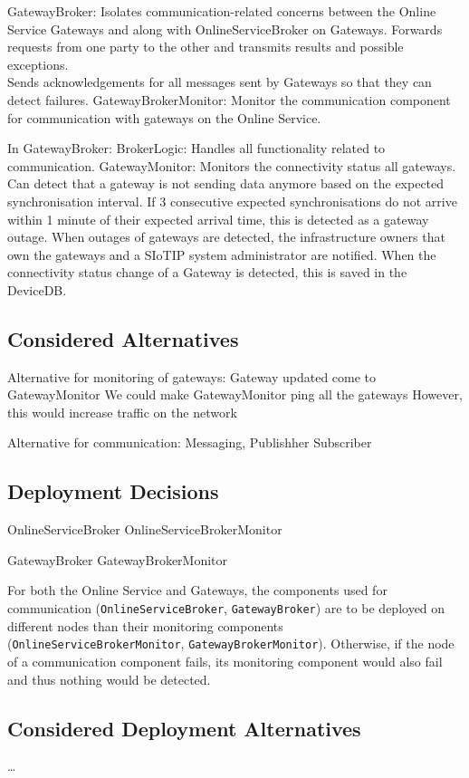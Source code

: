             GatewayBroker: Isolates communication-related concerns between the Online Service Gateways and along with OnlineServiceBroker on Gateways.
                       Forwards requests from one party to the other and transmits results and possible exceptions. \\
                       Sends acknowledgements for all messages sent by Gateways so that they can detect failures.
            GatewayBrokerMonitor: Monitor the communication component for communication with gateways on the Online Service.

            In GatewayBroker:
                BrokerLogic: Handles all functionality related to communication.
                GatewayMonitor: Monitors the connectivity status all gateways. Can detect that a gateway is not sending data anymore based on the expected synchronisation interval. If 3 consecutive expected synchronisations do not arrive within 1 minute of their expected arrival time,
                            this is detected as a gateway outage. When outages of gateways are detected, the infrastructure owners that own the gateways and a SIoTIP system administrator are notified.
                            When the connectivity status change of a Gateway is detected, this is saved in the DeviceDB.



    \subsection*{Considered Alternatives}
        Alternative for monitoring of gateways:
            Gateway updated come to GatewayMonitor
            We could make GatewayMonitor ping all the gateways
            However, this would increase traffic on the network

        Alternative for communication:
            Messaging, Publishher Subscriber

    \subsection*{Deployment Decisions}
        OnlineServiceBroker
        OnlineServiceBrokerMonitor

        GatewayBroker
        GatewayBrokerMonitor

        For both the Online Service and Gateways, the components used for communication
        (\texttt{OnlineServiceBroker}, \texttt{GatewayBroker}) are to be deployed on different nodes than
        their monitoring components (\texttt{OnlineServiceBrokerMonitor}, \texttt{GatewayBrokerMonitor}).
        Otherwise, if the node of a communication
        component fails, its monitoring component would also fail and thus
        nothing would be detected.

    \subsection*{Considered Deployment Alternatives}
        \ldots
